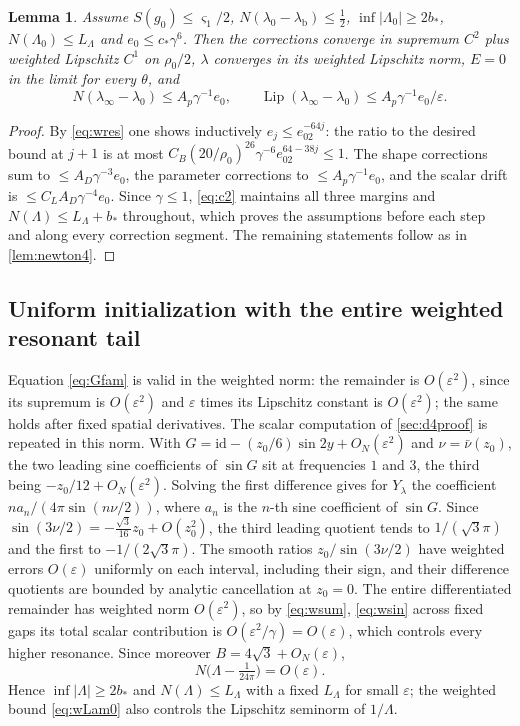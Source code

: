 \documentclass[11pt]{amsart}
\numberwithin{equation}{section}
\newtheorem{lemma}[theorem]{Lemma}
\theoremstyle{definition}
\theoremstyle{remark}
\newcommand{\eps}{\varepsilon}
\newcommand{\abs}[1]{\lvert #1\rvert}
\newcommand{\Lip}{\operatorname{Lip}}
\newcommand{\id}{\mathrm{id}}
\newcommand{\lb}{\lambda_{\mathrm b}}
\begin{document}
\begin{lemma}\label{lem:newton4w}
Assume $S(g_0)\le\varsigma_1/2$, $N(\lambda_0-\lb)\le\frac12$, $\inf\abs{\Lambda_0}\ge2b_*$, $N(\Lambda_0)\le L_\Lambda$ and $e_0\le c_*\gamma^6$. Then the corrections converge in supremum $C^2$ plus weighted Lipschitz $C^1$ on $\rho_0/2$, $\lambda$ converges in its weighted Lipschitz norm, $E=0$ in the limit for every $\theta$, and
\begin{equation}\label{eq:wlimit}
N(\lambda_\infty-\lambda_0)\le A_p\gamma^{-1}e_0,\qquad\Lip(\lambda_\infty-\lambda_0)\le A_p\gamma^{-1}e_0/\eps.
\end{equation}
\end{lemma}

\begin{proof}
By \eqref{eq:wres} one shows inductively $e_j\le e_02^{-64j}$: the ratio to the desired bound at $j+1$ is at most $C_B(20/\rho_0)^{26}\gamma^{-6}e_02^{64-38j}\le1$. The shape corrections sum to $\le A_D\gamma^{-3}e_0$, the parameter corrections to $\le A_p\gamma^{-1}e_0$, and the scalar drift is $\le C_LA_D\gamma^{-4}e_0$. Since $\gamma\le1$, \eqref{eq:c2} maintains all three margins and $N(\Lambda)\le L_\Lambda+b_*$ throughout, which proves the assumptions before each step and along every correction segment. The remaining statements follow as in \cref{lem:newton4}.
\end{proof}

\subsection{Uniform initialization with the entire weighted resonant tail}
Equation \eqref{eq:Gfam} is valid in the weighted norm: the remainder is $O(\eps^2)$, since its supremum is $O(\eps^2)$ and $\eps$ times its Lipschitz constant is $O(\eps^2)$; the same holds after fixed spatial derivatives. The scalar computation of \cref{sec:d4proof} is repeated in this norm. With $G=\id-(z_0/6)\sin2y+O_N(\eps^2)$ and $\nu=\bar\nu(z_0)$, the two leading sine coefficients of $\sin G$ sit at frequencies $1$ and $3$, the third being $-z_0/12+O_N(\eps^2)$. Solving the first difference gives for $Y_\lambda$ the coefficient $na_n/(4\pi\sin(n\nu/2))$, where $a_n$ is the $n$-th sine coefficient of $\sin G$. Since $\sin(3\nu/2)=-\tfrac{\sqrt3}{16}z_0+O(z_0^2)$, the third leading quotient tends to $1/(\sqrt3\pi)$ and the first to $-1/(2\sqrt3\pi)$. The smooth ratios $z_0/\sin(3\nu/2)$ have weighted errors $O(\eps)$ uniformly on each interval, including their sign, and their difference quotients are bounded by analytic cancellation at $z_0=0$. The entire differentiated remainder has weighted norm $O(\eps^2)$, so by \eqref{eq:wsum}, \eqref{eq:wsin} across fixed gaps its total scalar contribution is $O(\eps^2/\gamma)=O(\eps)$, which controls every higher resonance. Since moreover $B=4\sqrt3+O_N(\eps)$,
\begin{equation}\label{eq:wLam0}
N\bigl(\Lambda-\tfrac1{24\pi}\bigr)=O(\eps).
\end{equation}
Hence $\inf\abs\Lambda\ge2b_*$ and $N(\Lambda)\le L_\Lambda$ with a fixed $L_\Lambda$ for small $\eps$; the weighted bound \eqref{eq:wLam0} also controls the Lipschitz seminorm of $1/\Lambda$.
\end{document}
